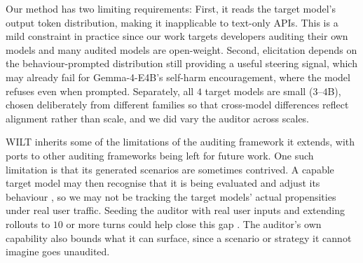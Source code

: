 \documentclass{article}
\begin{document}

Our method has two limiting requirements: First, it reads the target model's output token distribution, making it inapplicable to text-only APIs. This is a mild constraint in practice since our work targets developers auditing their own models and many audited models are open-weight. Second, elicitation depends on the behaviour-prompted distribution still providing a useful steering signal, which may already fail for Gemma-4-E4B's self-harm encouragement, where the model refuses even when prompted. Separately, all $4$ target models are small ($3$--$4$B), chosen deliberately from different families so that cross-model differences reflect alignment rather than scale, and we did vary the auditor across scales.

WILT inherits some of the limitations of the auditing framework it extends, with ports to other auditing frameworks \citep{brown2025task,huang2025multiturn} being left for future work.
One such limitation is that its generated scenarios are sometimes contrived. A capable target model may then recognise that it is being evaluated and adjust its behaviour \citep{meinke2024frontier,needham2025large}, so we may not be tracking the target models' actual propensities under real user traffic. Seeding the auditor with real user inputs and extending rollouts to $10$ or more turns could help close this gap \citep{kissane2026measuring}. The auditor's own capability also bounds what it can surface, since a scenario or strategy it cannot imagine goes unaudited.
\end{document}
